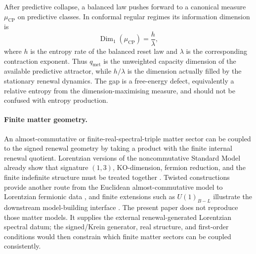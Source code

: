 \documentclass[11pt]{article}
\theoremstyle{definition}
\theoremstyle{remark}
\newcommand{\CP}{\mathrm{CP}}
\newcommand{\qmet}{q_{\mathrm{met}}}
\begin{document}
After predictive collapse, a balanced law pushes forward to a canonical measure
$\mu_{\CP}$ on predictive classes.  In conformal regular regimes its information
dimension is
\[
  \operatorname{Dim}_1(\mu_{\CP})=\frac{h}{\lambda},
\]
where $h$ is the entropy rate of the balanced reset law and $\lambda$ is the
corresponding contraction exponent.  Thus $\qmet$ is the unweighted capacity
dimension of the available predictive attractor, while $h/\lambda$ is the dimension
actually filled by the stationary renewal dynamics.  The gap is a free-energy
defect, equivalently a relative entropy from the dimension-maximising measure,
and should not be confused with entropy production.

\paragraph{Finite matter geometry.}
An almost-commutative or finite-real-spectral-triple matter sector can be
coupled to the signed renewal geometry by taking a product with the finite
internal renewal quotient.  Lorentzian versions of the noncommutative Standard
Model already show that signature \((1,3)\), KO-dimension, fermion reduction,
and the finite indefinite structure must be treated together
\cite{Barrett2007Lorentzian,BochniakSitarz2018,
BochniakSitarzZalecki2020}.  Twisted constructions provide another route from
the Euclidean almost-commutative model to Lorentzian fermionic data
\cite{DevastatoFarnsworthLizziMartinetti2018,
DevastatoFilaciMartinettiSingh2020}, and finite extensions such as
\(U(1)_{B-L}\) illustrate the downstream model-building interface
\cite{BesnardBrouder2019BL}.  The present paper does not reproduce those matter
models.  It supplies the external renewal-generated Lorentzian spectral datum;
the signed/Krein generator, real structure, and first-order conditions would
then constrain which finite matter sectors can be coupled consistently.
\end{document}
